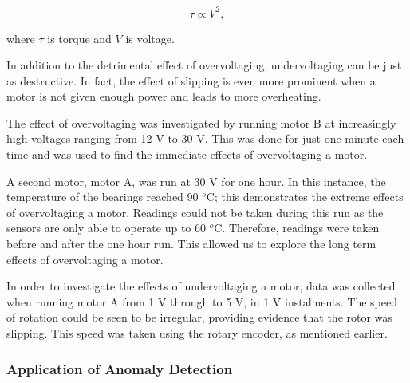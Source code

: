 \begin{equation}
\tau \propto V^2,
\label{Torque}
\end{equation}

where $\tau$ is torque and $V$ is voltage.

In addition to the detrimental effect of overvoltaging, undervoltaging can be just as destructive. In fact, the effect of slipping is even more prominent when a motor is not given enough power and leads to more overheating.


The effect of overvoltaging  was investigated by running motor B at increasingly high voltages ranging from 12 V to 30 V. This was done for just one minute each time and was used to find the immediate effects of overvoltaging a motor.
    

A second motor, motor A, was run at 30 V for one hour. In this instance, the temperature of the bearings reached 90 $^o$C; this demonstrates the extreme effects of overvoltaging a motor. Readings could not be taken during this run as the sensors are only able to operate %
up to 60 $^o$C. %
Therefore, readings were taken before and after the one hour run. This allowed us to explore the long term effects of overvoltaging a motor.


In order to investigate the effects of undervoltaging a motor, data was collected when running motor A from 1 V through to 5 V, in 1 V instalments. The speed of rotation could be seen to be irregular, providing evidence that the rotor was slipping. This speed was taken using the rotary encoder, as mentioned earlier. %


\subsubsection{Application of Anomaly Detection}



